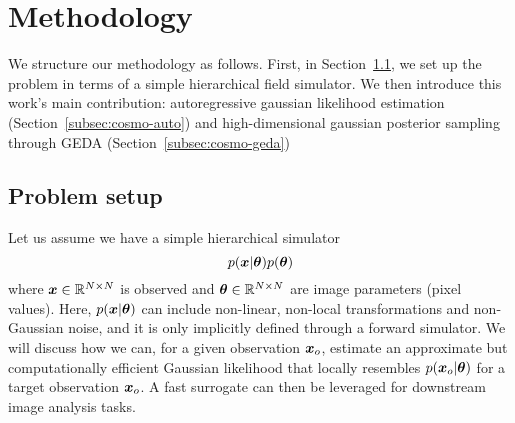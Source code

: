 \section{Methodology} \label{sec:cosmo-method}

We structure our methodology as follows. First, in Section~\ref{subsec:cosmo-setup}, we set up the problem in terms of a simple hierarchical field simulator. We then introduce this work's main contribution: autoregressive gaussian likelihood estimation (Section~\ref{subsec:cosmo-auto}) and high-dimensional gaussian posterior sampling through GEDA (Section~\ref{subsec:cosmo-geda})


\subsection{Problem setup} \label{subsec:cosmo-setup}



Let us assume we have a simple hierarchical simulator
\begin{equation}
    p(\bm{x}| \bm{\theta})p(\bm{\theta})
\end{equation}
where $\bm{x}\in \mathbb{R}^{N \times N}$ is observed and $\bm{\theta}\in \mathbb{R}^{N \times N}$ are image parameters (pixel values). Here, $p(\bm{x}|\bm{\theta})$ can include non-linear, non-local transformations and non-Gaussian noise, and it is only implicitly defined through a forward simulator. We will discuss how we can, for a given observation $\bm{x}_o$, estimate an approximate but computationally efficient Gaussian likelihood that locally resembles $p(\bm{x}_o|\bm{\theta})$ for a target observation $\bm{x}_o$. 
A fast surrogate can then be leveraged for downstream image analysis tasks.


